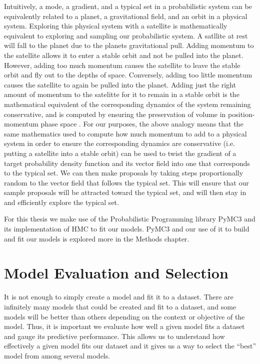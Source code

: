 Intuitively, a mode, a gradient, and a typical set in a probabilistic system can be equivalently related to a planet, a gravitational field, and an orbit in a physical system. Exploring this physical system with a satellite is mathematically equivalent to exploring and sampling our probabilistic system. A satllite at rest will fall to the planet due to the planets gravitational pull. Adding momentum to the satellite allows it to enter a stable orbit and not be pulled into the planet. However, adding too much momentum causes the satellite to leave the stable orbit and fly out to the depths of space. Conversely, adding too little momentum causes the satellite to again be pulled into the planet. Adding just the right amount of momentum to the satelitte for it to remain in a stable orbit is the mathematical equivalent of the corresponding dynamics of the system remaining conservative, and is computed by ensuring the preservation of volume in position-momentum phase space \cite{Betancourt2017}. For our purposes, the above analogy means that the same mathematics used to compute how much momentum to add to a physical system in order to ensure the corresponding dynamics are conservative (i.e. putting a satellite into a stable orbit) can be used to twist the gradient of a target probability density function and its vector field into one that corresponds to the typical set. We can then make proposals by taking steps proportionally random to the vector field that follows the typical set. This will ensure that our sample proposals will be attracted toward the typical set, and will then stay in and efficiently explore the typical set.

For this thesis we make use of the Probabilistic Programming library PyMC3 \cite{pymc3} and its implementation of HMC to fit our models. PyMC3 and our use of it to build and fit our models is explored more in the Methods chapter.

\section{Model Evaluation and Selection}

It is not enough to simply create a model and fit it to a dataset. There are infinitely many models that could be created and fit to a dataset, and some models will be better than others depending on the context or objective of the model. Thus, it is important we evaluate how well a given model fits a dataset and gauge its predictive performance. This allows us to understand how effectively a given model fits our dataset and it gives us a way to select the ``best'' model from among several models.

